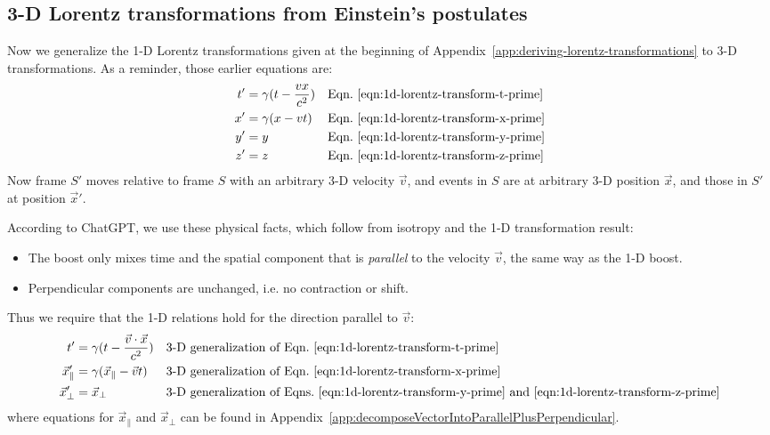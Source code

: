 \documentclass[a4paper]{article}
\theoremstyle{plain}
\theoremstyle{definition}
\newcommand{\vect}[1]{\vec{#1}}
\begin{document}
\subsection{3-D Lorentz transformations from Einstein's postulates}
\label{app:3d-lorentz-transformations}

Now we generalize the 1-D Lorentz transformations given at the
beginning of Appendix~\ref{app:deriving-lorentz-transformations} to
3-D transformations.
As a reminder, those earlier equations are:
\begin{align*}
t' & = \gamma (t - \frac{vx}{c^2}) & & \text{Eqn.~\eqref{eqn:1d-lorentz-transform-t-prime}} \\
x' & = \gamma (x - vt) & & \text{Eqn.~\eqref{eqn:1d-lorentz-transform-x-prime}} \\
y' & = y & & \text{Eqn.~\eqref{eqn:1d-lorentz-transform-y-prime}} \\
z' & = z & & \text{Eqn.~\eqref{eqn:1d-lorentz-transform-z-prime}}
\end{align*}
Now frame $S'$ moves relative to frame $S$ with
an arbitrary 3-D velocity $\vect{v}$, and events in $S$ are at arbitrary
3-D position $\vect{x}$, and those in $S'$ at position $\vect{x}'$.

According to ChatGPT, we use these physical facts, which follow from
isotropy and the 1-D transformation result:
\begin{itemize}
\item The boost only mixes time and the spatial component that is
  {\em parallel} to the velocity $\vect{v}$, the same way as the 1-D
  boost.
\item Perpendicular components are unchanged, i.e. no contraction or
  shift.
\end{itemize}
Thus we require that the 1-D relations hold for the direction parallel
to $\vect{v}$:
\begin{align}
t' & = \gamma (t - \frac{\vect{v} \cdot \vect{x}}{c^2}) & & \text{3-D generalization of Eqn.~\eqref{eqn:1d-lorentz-transform-t-prime}} \label{eqn:3d-lorentz-transform-t-prime} \\
\vect{x}'_{\parallel} & = \gamma (\vect{x}_{\parallel} - \vect{v}t) & & \text{3-D generalization of Eqn.~\eqref{eqn:1d-lorentz-transform-x-prime}} \label{eqn:3d-lorentz-transform-x-prime-parallel} \\
\vect{x}'_{\perp} & = \vect{x}_{\perp} & & \text{3-D generalization of Eqns.~\eqref{eqn:1d-lorentz-transform-y-prime} and~\eqref{eqn:1d-lorentz-transform-z-prime}} \label{eqn:3d-lorentz-transform-x-prime-perp}
\end{align}
where equations for $\vect{x}_{\parallel}$ and $\vect{x}_{\perp}$ can
be found in
Appendix~\ref{app:decomposeVectorIntoParallelPlusPerpendicular}.
\end{document}
